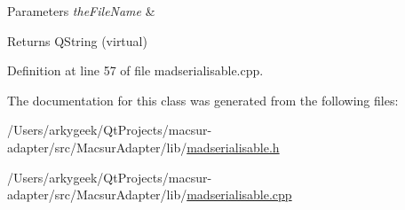 \begin{DoxyParams}{Parameters}
{\em the\-File\-Name} & \\
\hline
\end{DoxyParams}
\begin{DoxyReturn}{Returns}
Q\-String (virtual) 
\end{DoxyReturn}


Definition at line 57 of file madserialisable.\-cpp.



The documentation for this class was generated from the following files\-:\begin{DoxyCompactItemize}
\item 
/\-Users/arkygeek/\-Qt\-Projects/macsur-\/adapter/src/\-Macsur\-Adapter/lib/\hyperlink{madserialisable_8h}{madserialisable.\-h}\item 
/\-Users/arkygeek/\-Qt\-Projects/macsur-\/adapter/src/\-Macsur\-Adapter/lib/\hyperlink{madserialisable_8cpp}{madserialisable.\-cpp}\end{DoxyCompactItemize}
